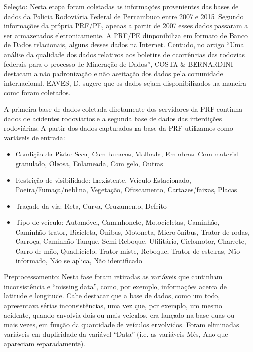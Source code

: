 Seleção: Nesta etapa foram coletadas as informações provenientes das bases de dados da Policia Rodoviária Federal de Pernambuco entre 2007 e 2015. Segundo informações da própria PRF/PE, apenas a partir de 2007 esses dados passaram a ser armazenados eletronicamente. A PRF/PE dinponibiliza em formato de Banco de Dados relacionais, alguns desses dados na Internet.
Contudo, no artigo “Uma análise da qualidade dos dados relativos aos boletins de ocorrências das rodovias federais para o processo de Mineração de Dados”, COSTA \& BERNARDINI \cite{Costa2015} destacam a não padronização e não aceitação dos dados pela comunidade internacional. EAVES, D. \cite{Eaves} sugere que os dados sejam disponibilizados na maneira como foram
coletados. 

\vspace{5mm}

A primeira base de dados coletada diretamente dos servidores da PRF continha dados de acidentes rodoviários e a segunda base de dados das interdições rodoviárias. 
A partir dos dados capturados na base da PRF utilizamos como variáveis de entrada:

\begin{itemize}
 \item Condição da Pista: {Seca, Com buracos, Molhada, Em obras, Com material granulado, Oleosa, Enlameada, Com gelo, Outras}
 \item Restrição de visibilidade: {Inexistente, Veículo Estacionado, Poeira/Fumaça/neblina, Vegetação, Ofuscamento, Cartazes/faixas, Placas}
 \item Traçado da via: {Reta, Curva, Cruzamento, Defeito}
 \item Tipo de veículo: {Automóvel, Caminhonete, Motocicletas, Caminhão, Caminhão-trator, Bicicleta, Ônibus, Motoneta, Micro-ônibus, Trator de rodas, Carroça, Caminhão-Tanque, Semi-Reboque, Utilitário, Ciclomotor, Charrete, Carro-de-mão, Quadriciclo, Trator misto, Reboque, Trator de esteiras, Não informado, Não se aplica, Não identificado}
\end{itemize}

\vspace{5mm}

Preprocessamento: Nesta fase foram retiradas as variáveis que continham inconsistência e “missing data”, como, por exemplo, informações acerca de latitude e longitude. Cabe destacar que a base de dados, como um todo, apresentava sérias inconsistências, uma vez que, por exemplo,
um mesmo acidente, quando envolvia dois ou mais veículos,
era lançado na base duas ou mais vezes, em função da
quantidade de veículos envolvidos. Foram eliminadas variáveis
em duplicidade da variável ``Data'' (i.e. as variáveis Mês, Ano que apareciam
separadamente).

